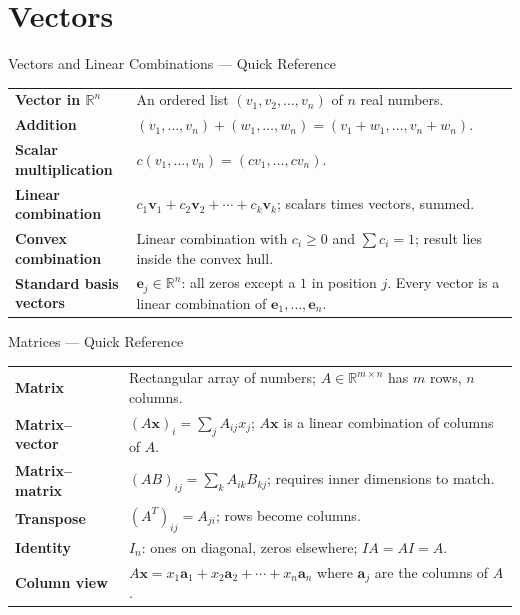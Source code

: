 

\section{Vectors}

\begin{toolkitbox}{Vectors and Linear Combinations --- Quick Reference}
\begin{tabular}{@{}p{}p{}@{}}
\textbf{Vector in $\mathbb{R}^n$}     & An ordered list $(v_1, v_2, \ldots, v_n)$ of $n$ real numbers. \\[4pt]
\textbf{Addition}                      & $(v_1,\ldots,v_n)+(w_1,\ldots,w_n) = (v_1+w_1,\ldots,v_n+w_n)$. \\[4pt]
\textbf{Scalar multiplication}         & $c(v_1,\ldots,v_n) = (cv_1,\ldots,cv_n)$. \\[4pt]
\textbf{Linear combination}            & $c_1\mathbf{v}_1 + c_2\mathbf{v}_2 + \cdots + c_k\mathbf{v}_k$; scalars times vectors, summed. \\[4pt]
\textbf{Convex combination}            & Linear combination with $c_i \geq 0$ and $\sum c_i = 1$; result lies inside the convex hull. \\[4pt]
\textbf{Standard basis vectors}        & $\mathbf{e}_j \in \mathbb{R}^n$: all zeros except a $1$ in position $j$. Every vector is a linear combination of $\mathbf{e}_1,\ldots,\mathbf{e}_n$. \\
\end{tabular}
\end{toolkitbox}


\begin{toolkitbox}{Matrices --- Quick Reference}
\begin{tabular}{@{}p{}p{}@{}}
\textbf{Matrix}            & Rectangular array of numbers; $A \in \mathbb{R}^{m \times n}$ has $m$ rows, $n$ columns. \\[4pt]
\textbf{Matrix--vector}    & $(A\mathbf{x})_i = \sum_j A_{ij} x_j$; $A\mathbf{x}$ is a linear combination of columns of $A$. \\[4pt]
\textbf{Matrix--matrix}    & $(AB)_{ij} = \sum_k A_{ik} B_{kj}$; requires inner dimensions to match. \\[4pt]
\textbf{Transpose}         & $(A^T)_{ij} = A_{ji}$; rows become columns. \\[4pt]
\textbf{Identity}          & $I_n$: ones on diagonal, zeros elsewhere; $IA = AI = A$. \\[4pt]
\textbf{Column view}       & $A\mathbf{x} = x_1\mathbf{a}_1 + x_2\mathbf{a}_2 + \cdots + x_n\mathbf{a}_n$ where $\mathbf{a}_j$ are the columns of $A$. \\
\end{tabular}
\end{toolkitbox}


